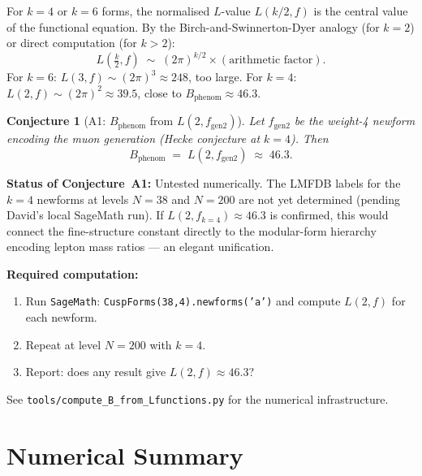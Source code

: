 \documentclass[12pt,a4paper]{article}
\newtheorem{conjecture}[theorem]{Conjecture}
\theoremstyle{definition}
\theoremstyle{remark}
\begin{document}
For $k=4$ or $k=6$ forms, the normalised $L$-value $L(k/2, f)$ is the
central value of the functional equation.  By the Birch-and-Swinnerton-Dyer
analogy (for $k=2$) or direct computation (for $k>2$):
\begin{equation}
  L\!\left(\tfrac{k}{2}, f\right)
  \;\sim\; (2\pi)^{k/2} \times (\text{arithmetic factor}).
\end{equation}
For $k=6$: $L(3,f) \sim (2\pi)^3 \approx 248$, too large.
For $k=4$: $L(2,f) \sim (2\pi)^2 \approx 39.5$, close to
$B_{\mathrm{phenom}} \approx 46.3$.

\begin{conjecture}[A1: $B_{\mathrm{phenom}}$ from $L(2, f_{\mathrm{gen2}})$]
\label{conj:A1}
Let $f_{\mathrm{gen2}}$ be the weight-4 newform encoding the muon generation
(Hecke conjecture at $k=4$).  Then
\[
  B_{\mathrm{phenom}} \;=\; L\!\left(2, f_{\mathrm{gen2}}\right)
  \;\approx\; 46.3.
\]
\end{conjecture}

\begin{gapbox}
\textbf{Status of Conjecture~A1:} Untested numerically.
The LMFDB labels for the $k=4$ newforms at levels $N=38$ and $N=200$
are not yet determined (pending David's local SageMath run).
If $L(2, f_{k=4}) \approx 46.3$ is confirmed, this would connect
the fine-structure constant directly to the modular-form hierarchy
encoding lepton mass ratios --- an elegant unification.

\textbf{Required computation:}
\begin{enumerate}
  \item Run \texttt{SageMath}: \texttt{CuspForms(38,4).newforms('a')} and
        compute $L(2,f)$ for each newform.
  \item Repeat at level $N=200$ with $k=4$.
  \item Report: does any result give $L(2,f) \approx 46.3$?
\end{enumerate}
See \texttt{tools/compute\_B\_from\_Lfunctions.py} for the numerical
infrastructure.
\end{gapbox}

\section{Numerical Summary}
\label{sec:numerical_summary}
\end{document}
